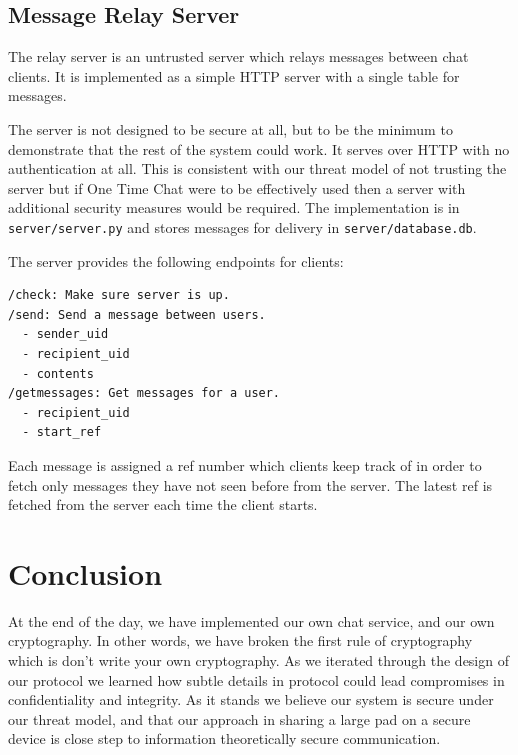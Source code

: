 \documentclass[twocolumn]{article}
\begin{document}
\subsection{Message Relay Server}
The relay server is an untrusted server which relays messages between chat clients.
It is implemented as a simple HTTP server with a single table for messages.

The server is not designed to be secure at all, but to be the minimum to demonstrate that
the rest of the system could work. It serves over HTTP with no authentication at all.
This is consistent with our threat model of not trusting the server but if One Time Chat were to be effectively used then a server with additional security measures would be required. The implementation is in \texttt{server/server.py} and stores messages for delivery in \texttt{server/database.db}.

The server provides the following endpoints for clients:
\begin{lstlisting}
/check: Make sure server is up.
/send: Send a message between users.
  - sender_uid
  - recipient_uid
  - contents
/getmessages: Get messages for a user.
  - recipient_uid
  - start_ref
\end{lstlisting}

Each message is assigned a ref number which clients keep track of in order
to fetch only messages they have not seen before from the server.
The latest ref is fetched from the server each time the client starts.



\section{Conclusion}
At the end of the day, we have implemented our own chat service, and our own cryptography. In other words, we have broken the first rule of cryptography which is don't write your own cryptography. As we iterated through the design of our protocol we learned how subtle details in protocol could lead compromises in confidentiality and integrity. As it stands we believe our system is secure under our threat model, and that our approach in sharing a large pad on a secure device is close step to information theoretically secure communication.


\end{document}
